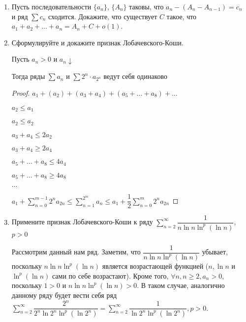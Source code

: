 \documentclass[a4paper]{article}
\begin{document}
\begin{enumerate}
\begin{proof}
        $c = \lim_{n \to \infty} \frac{a_n}{b_n} > 0$
        
        $\forall \epsilon\ \exists n_0:\ c - \epsilon \leqslant \frac{a_n}{b_n} \leqslant c + \epsilon$, при $n \geqslant n_0$
        
        Возьмём $c - \epsilon > 0 \implies (c - \epsilon)\cdot b_n \leqslant a_n \leqslant (c + \epsilon)\cdot b_n$
        
        Сходимость следует из правой части неравенства, а расходимость из левой. 
        \end{proof}
        \item Пусть последовательности $\{a_n\}$, $\{A_n\}$ таковы, что $a_n - (A_n - A_{n - 1}) = c_n$ и ряд $\sum c_n$ сходится.
        Докажите, что существует $C$ такое, что $a_1 + a_2 + \dots + a_n = A_n + C + o(1)$. 
        \item Сформулируйте и докажите признак Лобачевского-Коши.
        \begin{proposal}
            Пусть $a_n > 0$ и $a_n \downarrow$
        
            Тогда ряды $\sum a_n$ и $\sum 2^n \cdot a_{2^n}$ ведут себя одинаково
        \end{proposal}
        \begin{proof}
            $a_1 + (a_2) + (a_3 + a_4) + (a_5 + \dots + a_8) + \dots$
        
            $a_2 \leq a_1$
            
            $a_2 \leq a_2$
        
            
            $a_3 + a_4 \leq 2a_2$
            
            $a_3 + a_4 \geq 2a_4$
        
            $a_5 + \dots + a_8 \leq 4a_4$
        
            $a_5 + \dots + a_8 \geq 4a_8$
        
        
            $\dots$
        
            $a_1 + \sum_{n=0}^{m - 1} 2^n a_{2n} \leq \sum_{n = 1}^{2^m} a_n \leq a_1 + \dfrac{1}{2} \sum_{n=0}^{m} 2^n a_{2n}$
        
        \end{proof}
        \item Примените признак Лобачевского-Коши к ряду $\sum_{n=2}^{\infty}\dfrac{1}{n \ln n \ln^{p}(\ln n)}$, $p > 0$
		
		Рассмотрим данный нам ряд. Заметим, что $\dfrac{1}{n \ln n \ln^{p}(\ln n)}$ убывает, поскольку $n \ln n \ln^{p}(\ln n)$ является возрастающей функцией ($n, \ln n$ и $\ln^{p}(\ln n)$ сами по себе возрастают). Кроме того, $\forall n, n \geqslant 2, a_n > 0$, поскольку $1 > 0$ и $n \ln n \ln^{p}(\ln n) > 0$. В таком случае, аналогично данному ряду будет вести себя ряд $\sum_{n=2}^{\infty}\dfrac{2^n}{2^n \ln 2^n \ln^{p}(\ln 2^n)} = \sum_{n=2}^{\infty}\dfrac{1}{\ln 2^n \ln^{p}(\ln 2^n)}, p > 0$.


\end{enumerate}
\end{document}
